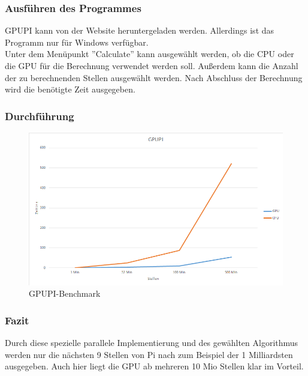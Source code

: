 \subsubsection{Ausführen des Programmes}
GPUPI kann von der Website heruntergeladen werden. \cite{gpupi} Allerdings ist das Programm nur für Windows verfügbar.\\
Unter dem Menüpunkt ''Calculate'' kann ausgewählt werden, ob die CPU oder die GPU für die Berechnung verwendet werden soll. Außerdem kann die Anzahl der zu berechnenden Stellen ausgewählt werden. Nach Abschluss der Berechnung wird die benötigte Zeit ausgegeben.
\subsubsection{Durchführung}
\begin{figure}[!h]
	\begin{center}
		\includegraphics[width=17cm]{images/gpupi.png}
		\caption{GPUPI-Benchmark}
	\end{center}
\end{figure}
\newpage
\subsubsection{Fazit}
Durch diese spezielle parallele Implementierung und des gewählten Algorithmus werden nur die nächsten 9 Stellen von Pi nach zum Beispiel der 1 Milliardsten ausgegeben. Auch hier liegt die GPU ab mehreren 10 Mio Stellen klar im Vorteil.
